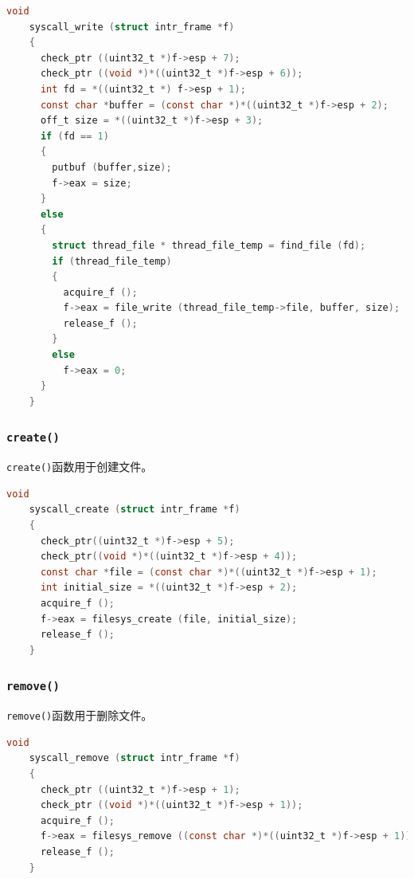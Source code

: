\documentclass{article}
\begin{document}
\begin{lstlisting}[language=C, title=\texttt{src/userprog/syscall.c - syscall\_write()}]
    void
    syscall_write (struct intr_frame *f)
    {
      check_ptr ((uint32_t *)f->esp + 7);
      check_ptr ((void *)*((uint32_t *)f->esp + 6));
      int fd = *((uint32_t *) f->esp + 1);
      const char *buffer = (const char *)*((uint32_t *)f->esp + 2);
      off_t size = *((uint32_t *)f->esp + 3);
      if (fd == 1) 
      {
        putbuf (buffer,size);
        f->eax = size;
      }
      else
      {
        struct thread_file * thread_file_temp = find_file (fd);
        if (thread_file_temp)
        {
          acquire_f ();
          f->eax = file_write (thread_file_temp->file, buffer, size);
          release_f ();
        } 
        else
          f->eax = 0;
      }
    }
\end{lstlisting}

\subsubsection{\texttt{create()}}

\texttt{create()}函数用于创建文件。

\begin{lstlisting}[language=C, title=\texttt{src/userprog/syscall.c - syscall\_create()}]
    void
    syscall_create (struct intr_frame *f)
    { 
      check_ptr((uint32_t *)f->esp + 5);
      check_ptr((void *)*((uint32_t *)f->esp + 4));
      const char *file = (const char *)*((uint32_t *)f->esp + 1);
      int initial_size = *((uint32_t *)f->esp + 2);
      acquire_f ();
      f->eax = filesys_create (file, initial_size);
      release_f ();
    }
\end{lstlisting}

\subsubsection{\texttt{remove()}}

\texttt{remove()}函数用于删除文件。

\begin{lstlisting}[language=C, title=\texttt{src/userprog/syscall.c - syscall\_remove()}]
    void
    syscall_remove (struct intr_frame *f)
    {
      check_ptr ((uint32_t *)f->esp + 1);
      check_ptr ((void *)*((uint32_t *)f->esp + 1));
      acquire_f ();
      f->eax = filesys_remove ((const char *)*((uint32_t *)f->esp + 1));
      release_f ();
    }
\end{lstlisting}
\end{document}
